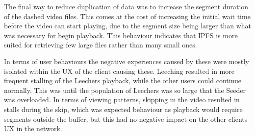 The final way to reduce duplication of data was to increase the segment duration of the dashed video files. This comes at the cost of increasing the initial wait time before the video can start playing, due to the segment size being larger than what was necessary for begin playback. This behaviour indicates that \ac{IPFS} is more suited for retrieving few large files rather than many small ones.

In terms of user behaviours the negative experiences caused by these were mostly isolated within the \ac{UX} of the client causing these. Leeching resulted in more frequent stalling of the Leechers playback, while the other users could continue normally. This was until the population of Leechers was so large that the Seeder was overloaded. In terms of viewing patterns, skipping in the video resulted in stalls during the skip, which was expected behaviour as playback would require segments outside the buffer, but this had no negative impact on the other clients \ac{UX} in the network.


